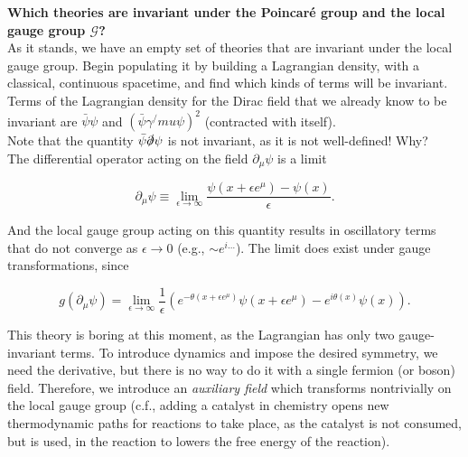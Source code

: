 \noindent \textbf{Which theories are invariant under the Poincar\'e group and the local gauge group $\mathcal{G}$?} \\

\noindent As it stands, we have an empty set of theories that are invariant under the local gauge group. Begin populating it by building a Lagrangian density, with a classical, continuous spacetime, and find which kinds of terms will be invariant. \\

\noindent Terms of the Lagrangian density for the Dirac field that we already know to be invariant are $\bar{\psi}\psi$ and $(\bar{\psi} \gamma^/mu \psi)^2$ (contracted with itself). \\

\noindent Note that the quantity $\bar{\psi} \slashed{\partial} \psi$ is not invariant, as it is not well-defined!  Why? \\

\noindent The differential operator acting on the field $\partial_\mu \psi$ is a limit

\begin{equation}
\partial_\mu \psi \equiv \lim_{\epsilon \rightarrow \infty} \frac{ \psi(x + \epsilon e^\mu) - \psi(x)}{\epsilon}.
\end{equation}

\noindent And the local gauge group acting on this quantity results in oscillatory terms that do not converge as $\epsilon \rightarrow 0$ (e.g., $\sim e^{i\dots}$). The limit does exist under gauge transformations, since

\begin{equation}
g(\partial_\mu \psi) = \lim_{\epsilon \rightarrow \infty} \frac{1}{\epsilon} (e^{- \theta(x + \epsilon e^\mu)} \psi(x + \epsilon e^\mu ) - e^{i \theta(x)} \psi (x) ).
\end{equation}

\noindent This theory is boring at this moment, as the Lagrangian has only two gauge-invariant terms. To introduce dynamics and impose the desired symmetry, we need the derivative, but there is no way to do it with a single fermion (or boson) field. Therefore, we introduce an \textit{auxiliary field} which transforms nontrivially on the local gauge group (c.f., adding a catalyst in chemistry opens new thermodynamic paths for reactions to take place, as the catalyst is not consumed, but is used, in the reaction to lowers the free energy of the reaction). \\

